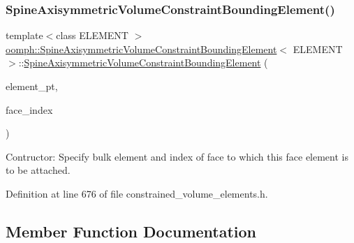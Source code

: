 \subsubsection{\texorpdfstring{Spine\+Axisymmetric\+Volume\+Constraint\+Bounding\+Element()}{SpineAxisymmetricVolumeConstraintBoundingElement()}}
{\footnotesize\ttfamily template$<$class E\+L\+E\+M\+E\+NT $>$ \\
\hyperlink{classoomph_1_1SpineAxisymmetricVolumeConstraintBoundingElement}{oomph\+::\+Spine\+Axisymmetric\+Volume\+Constraint\+Bounding\+Element}$<$ E\+L\+E\+M\+E\+NT $>$\+::\hyperlink{classoomph_1_1SpineAxisymmetricVolumeConstraintBoundingElement}{Spine\+Axisymmetric\+Volume\+Constraint\+Bounding\+Element} (\begin{DoxyParamCaption}\item[{Finite\+Element $\ast$const \&}]{element\+\_\+pt,  }\item[{const int \&}]{face\+\_\+index }\end{DoxyParamCaption})\hspace{0.3cm}{\ttfamily [inline]}}



Contructor\+: Specify bulk element and index of face to which this face element is to be attached. 



Definition at line 676 of file constrained\+\_\+volume\+\_\+elements.\+h.



\subsection{Member Function Documentation}
\mbox{\label{classoomph_1_1SpineAxisymmetricVolumeConstraintBoundingElement_a5813860802c0474ef6ff5f249ca7141f}} 
